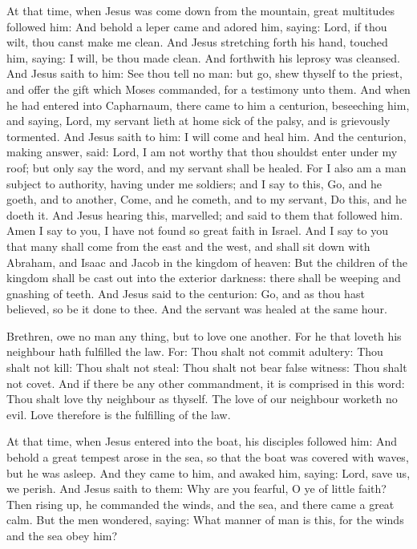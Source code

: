 \begin{multicols}{2}

At that time, when Jesus was come down from the mountain, great multitudes followed him: And
behold a leper came and adored him, saying: Lord, if thou wilt, thou canst make
me clean.  And Jesus stretching forth his hand, touched him, saying: I will, be
thou made clean. And forthwith his leprosy was cleansed.  And Jesus saith to
him: See thou tell no man: but go, shew thyself to the priest, and offer the
gift which Moses commanded, for a testimony unto them.  And when he had entered
into Capharnaum, there came to him a centurion, beseeching him, and saying,
Lord, my servant lieth at home sick of the palsy, and is grievously tormented.
And Jesus saith to him: I will come and heal him.  And the centurion, making
answer, said: Lord, I am not worthy that thou shouldst enter under my roof; but
only say the word, and my servant shall be healed.  For I also am a man subject
to authority, having under me soldiers; and I say to this, Go, and he goeth,
and to another, Come, and he cometh, and to my servant, Do this, and he doeth
it.  And Jesus hearing this, marvelled; and said to them that followed him.
Amen I say to you, I have not found so great faith in Israel.  And I say to you
that many shall come from the east and the west, and shall sit down with
Abraham, and Isaac and Jacob in the kingdom of heaven: But the children of the
kingdom shall be cast out into the exterior darkness: there shall be weeping
and gnashing of teeth.  And Jesus said to the centurion: Go, and as thou hast
believed, so be it done to thee. And the servant was healed at the same hour.



\bigskip



Brethren, owe no man any thing, but to love one another. For he that loveth his neighbour
hath fulfilled the law.  For: Thou shalt not commit adultery: Thou shalt not
kill: Thou shalt not steal: Thou shalt not bear false witness: Thou shalt not
covet. And if there be any other commandment, it is comprised in this word:
Thou shalt love thy neighbour as thyself.  The love of our neighbour worketh no
evil. Love therefore is the fulfilling of the law.



At that time, when Jesus entered into the boat, his disciples followed him: And behold a
great tempest arose in the sea, so that the boat was covered with waves, but he
was asleep.  And they came to him, and awaked him, saying: Lord, save us, we
perish.  And Jesus saith to them: Why are you fearful, O ye of little faith?
Then rising up, he commanded the winds, and the sea, and there came a great
calm.  But the men wondered, saying: What manner of man is this, for the winds
and the sea obey him?



\end{multicols}
